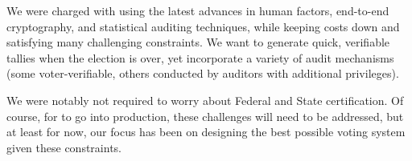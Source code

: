 We were charged with using the latest advances in human factors,
end-to-end cryptography, and statistical auditing techniques, while
keeping costs down and satisfying many challenging constraints.
We want to generate quick, verifiable tallies when the election is
over, yet incorporate a variety of audit mechanisms (some
voter-verifiable, others conducted by auditors with additional
privileges). 

We were notably not required to worry about Federal and State
certification. Of course, for \projname to go into production, these
challenges will need to be addressed, but at least for now, our focus
has been on designing the best possible voting system given these
constraints.

